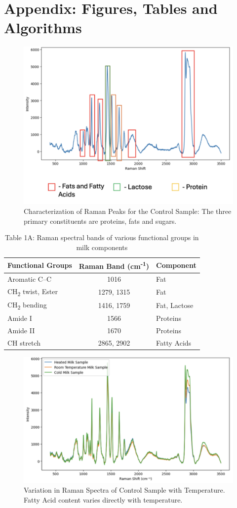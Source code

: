 %

\clearpage
\appendix
\section{Appendix: Figures, Tables and Algorithms}

\begin{figure}[h!]
    \centering
    \includegraphics[width=0.5\linewidth]{Figures/Screenshot 2025-07-16 at 2.26.41 PM.png}
    \caption{Characterization of Raman Peaks for the Control Sample: The three primary constituents are proteins, fats and sugars.}
    \label{fig:ram}
\end{figure}

\begin{table}[h!]
\centering
\begin{tabular}{|l|c|l|}
\hline
\textbf{Functional Groups} & \textbf{Raman Band (cm\textsuperscript{-1})} & \textbf{Component} \\
\hline
Aromatic C--C & 1016 & Fat \\
CH\textsubscript{2} twist, Ester & 1279, 1315 & Fat \\
CH\textsubscript{2} bending & 1416, 1759 & Fat, Lactose \\
Amide I & 1566 & Proteins \\
Amide II & 1670 & Proteins \\
CH stretch & 2865, 2902 & Fatty Acids \\
\hline
\end{tabular}
\caption*{Table 1A: Raman spectral bands of various functional groups in milk components}
\label{tab:raman_bands}
\end{table}


\begin{figure}[h!]
    \centering
    \includegraphics[width=0.5\linewidth]{Figures/Screenshot 2025-07-16 at 2.27.09 PM.png}
    \caption{Variation in Raman Spectra of Control Sample with Temperature. Fatty Acid content varies directly with temperature.}
    \label{fig:temp}
\end{figure}

